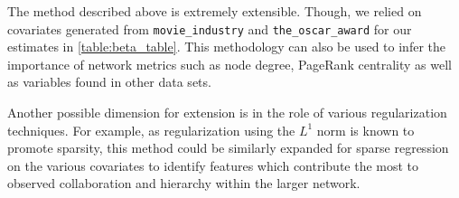 \documentclass{article}
\begin{document}
The method described above is extremely extensible. Though, we relied on covariates generated from \texttt{movie\_industry} and \texttt{the\_oscar\_award} for our estimates in \ref{table:beta_table}. This methodology can also be used to infer the importance of network metrics such as node degree, PageRank centrality as well as variables found in other data sets.

Another possible dimension for extension is in the role of various regularization techniques. For example, as regularization using the $L^1$ norm is known to promote sparsity, this method could be similarly expanded for sparse regression on the various covariates to identify features which contribute the most to observed collaboration and hierarchy within the larger network.
\newpage



\end{document}
